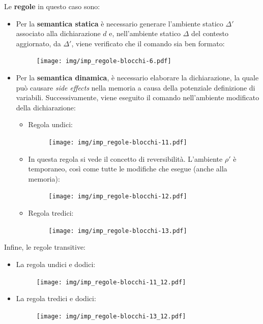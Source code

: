 \documentclass[a4paper]{article}
\begin{document}
 	\noindent
 	Le \textbf{regole} in questo caso sono:
 	\begin{itemize}
 		\item Per la \textbf{semantica statica} è necessario generare l'ambiente statico $\Delta'$ associato alla dichiarazione $d$ e, nell'ambiente statico $\Delta$ del contesto aggiornato, da $\Delta'$, viene verificato che il comando sia ben formato:
 		\begin{figure}[!htp]
 			\centering
 			\texttt{[image: img/imp\_regole-blocchi-6.pdf]}
 		\end{figure}
 		
 		\item Per la \textbf{semantica dinamica}, è necessario elaborare la dichiarazione, la quale può causare \emph{side effects} nella memoria a causa della potenziale definizione di variabili. Successivamente, viene eseguito il comando nell'ambiente modificato della dichiarazione:
 		\begin{itemize}
 			\item Regola undici:
 			\begin{figure}[!htp]
 				\centering
 				\texttt{[image: img/imp\_regole-blocchi-11.pdf]}
 			\end{figure}\newpage
 			
 			\item In questa regola si vede il concetto di reversibilità. L'ambiente $\rho'$ è temporaneo, così come tutte le modifiche che esegue (anche alla memoria):
 			\begin{figure}[!htp]
 				\centering
 				\texttt{[image: img/imp\_regole-blocchi-12.pdf]}
 			\end{figure}
 			
 			\item Regola tredici:
 			\begin{figure}[!htp]
 				\centering
 				\texttt{[image: img/imp\_regole-blocchi-13.pdf]}
 			\end{figure}
 		\end{itemize}
 	\end{itemize}
 	Infine, le regole transitive:
 	\begin{itemize}
 		\item La regola undici e dodici:
 		\begin{figure}[!htp]
 			\centering
 			\texttt{[image: img/imp\_regole-blocchi-11\_12.pdf]}
 		\end{figure}
 		
 		\item La regola tredici e dodici:
 		\begin{figure}[!htp]
 			\centering
 			\texttt{[image: img/imp\_regole-blocchi-13\_12.pdf]}
 		\end{figure}
 	\end{itemize}
\end{document}
